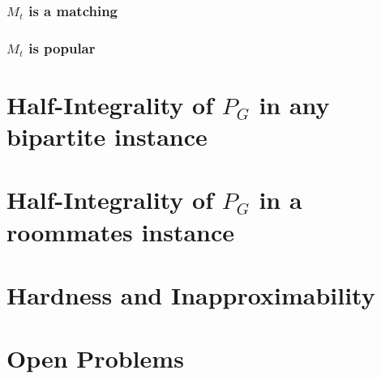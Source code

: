 \documentclass[10pt]{beamer}
\begin{document}
\begin{frame}
\frametitle{$M_t$ is a matching}
\end{frame}

\begin{frame}
\frametitle{$M_t$ is popular}
\end{frame}
\section{Half-Integrality of $P_G$ in any bipartite instance}
\section{Half-Integrality of $P_G$ in a roommates instance}

\section{Hardness and Inapproximability}

\section{Open Problems}
\end{document}
